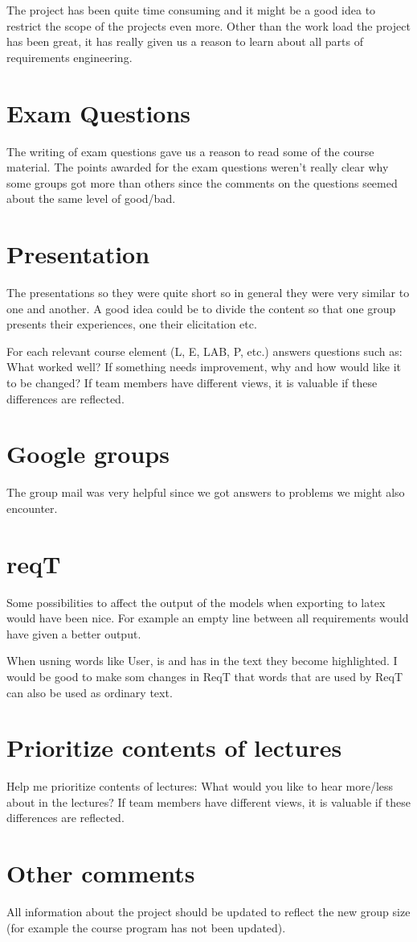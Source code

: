 \documentclass[a4paper]{article}
\begin{document}
	The project has been quite time consuming and it might be a good idea to restrict the scope of the projects even more. Other than the work load the project has been great, it has really given us a reason to learn about all parts of requirements engineering.

	\section{Exam Questions}
	The writing of exam questions gave us a reason to read some of the course material. The points awarded for the exam questions weren't really clear why some groups got more than others since the comments on the questions seemed about the same level of good/bad.	
	
	\section{Presentation}
The presentations so they were quite short so in general they were very similar to	one and another. A good idea could be to divide the content so that one group presents their experiences, one their elicitation etc.
	
	
	For each relevant course element (L, E, LAB, P, etc.) answers questions such as:
What worked well? If something needs improvement, why and how would like
it to be changed?
If team members have different views, it is valuable if these differences are
reflected.

	\section{Google groups}
	The group mail was very helpful since we got answers to problems we might also encounter.

	\section{reqT}
	Some possibilities to affect the output of the models when exporting to latex would have been nice. For example an empty line between all requirements would have given a better output.

	When usning words like User, is and has in the text they become highlighted. I would be good to make som changes in ReqT that words that are used by ReqT can also be used as ordinary text.

	\section{Prioritize contents of lectures}
	Help me prioritize contents of lectures:
What would you like to hear more/less about in the lectures?
If team members have different views, it is valuable if these differences are
reflected.

	\section{Other comments}
	All information about the project should be updated to reflect the new group size (for example the course program has not been updated).
\end{document}
